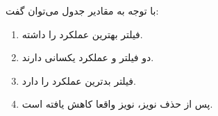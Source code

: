 {    با توجه به مقادیر جدول می‌توان گفت:
    
    \begin{enumerate}
        \item فیلتر  بهترین عملکرد را داشته.
        \item دو فیلتر  و  عملکرد یکسانی دارند.
        \item فیلتر  بدترین عملکرد را دارد.
        \item پس از حذف نویز، نویز واقعا کاهش یافته است.
    \end{enumerate}
    
}
